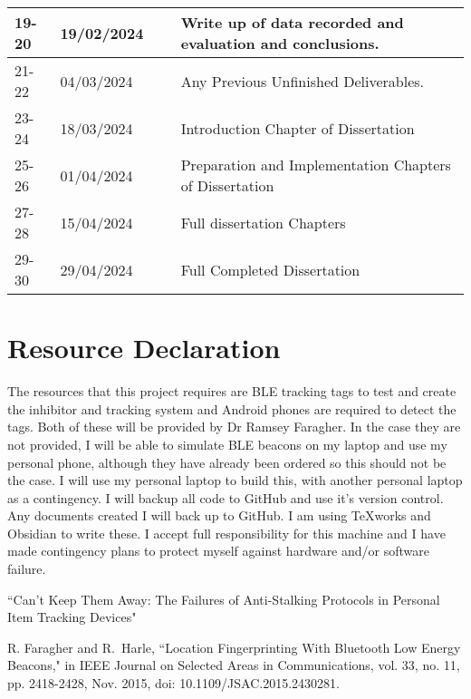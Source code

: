\documentclass[12pt]{article}
\begin{document}
\begin{table}[!ht]
\begin{tabular}{|p{1cm}|p{2cm}|p{6cm}|p{6cm}|}
        19-20 & 19/02/2024 & ~ & Write up of data recorded and evaluation and conclusions. \\ \hline
        21-22 & 04/03/2024 & ~ & Any Previous Unfinished Deliverables. \\ \hline
        23-24 & 18/03/2024 & ~ & Introduction Chapter of Dissertation \\ \hline
        25-26 & 01/04/2024 & ~ & Preparation and Implementation Chapters of Dissertation \\ \hline
        27-28 & 15/04/2024 & ~ & Full dissertation Chapters \\ \hline
        29-30 & 29/04/2024 & ~ & Full Completed Dissertation \\ \hline
    \end{tabular}
\end{table}
\section{Resource Declaration}

The resources that this project requires are BLE tracking tags to test and create the inhibitor and tracking system and
Android phones are required to detect the tags.
Both of these will be provided by Dr Ramsey Faragher. 
In the case they are not provided, I will be able to simulate BLE beacons on my laptop and use my personal phone, although they have already been ordered so this should not be the case.
I will use my personal laptop to build this, with another personal laptop as a contingency. I will backup all code to GitHub and use it's version control. Any documents created I will back up to GitHub. I am using TeXworks and Obsidian to write these.
I accept full responsibility for this machine and I have made contingency plans to protect myself against hardware and/or software failure.


\begin{thebibliography}{9}
\frenchspacing
{}``Can’t Keep Them Away: The Failures of
Anti-Stalking Protocols in Personal Item Tracking Devices"

 R. Faragher and R.~Harle, ``Location Fingerprinting With Bluetooth Low Energy Beacons," in IEEE Journal on Selected Areas in Communications, vol. 33, no. 11, pp. 2418-2428, Nov. 2015, doi: 10.1109/JSAC.2015.2430281.

\end{thebibliography}
\end{document}
